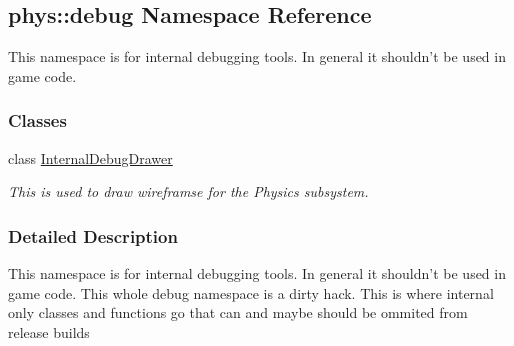 \hypertarget{namespacephys_1_1debug}{
\subsection{phys::debug Namespace Reference}
\label{d0/d53/namespacephys_1_1debug}
}


This namespace is for internal debugging tools. In general it shouldn't be used in game code.  


\subsubsection*{Classes}
\begin{DoxyCompactItemize}
\item 
class \hyperlink{classphys_1_1debug_1_1InternalDebugDrawer}{InternalDebugDrawer}
\begin{DoxyCompactList}\small\item\em This is used to draw wireframse for the Physics subsystem. \item\end{DoxyCompactList}\end{DoxyCompactItemize}


\subsubsection{Detailed Description}
This namespace is for internal debugging tools. In general it shouldn't be used in game code. This whole debug namespace is a dirty hack. This is where internal only classes and functions go that can and maybe should be ommited from release builds 